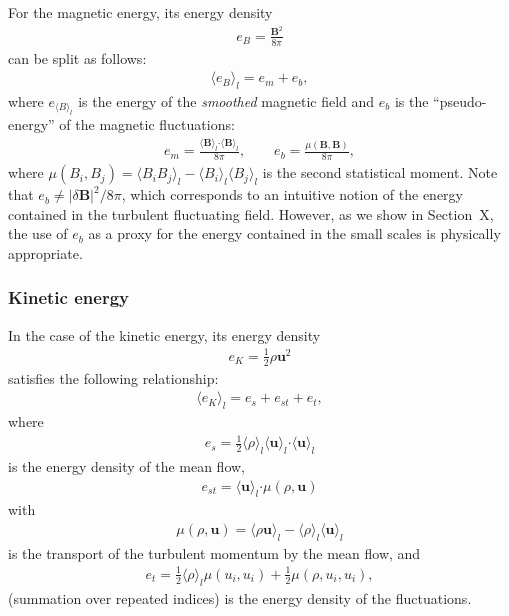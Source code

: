 \documentclass[]{article}
\newcommand{\bcdot}{\bm{\cdot}}
\begin{document}
For the magnetic energy, its energy density 
%
\begin{align}
	e_B = \frac{\bm B^2}{8\pi}
\end{align}
%
can be split as follows:
%
\begin{align}
	\langle e_B \rangle_l = e_{m} + e_b,
\end{align}
%
where $e_{\langle B \rangle_l}$ is the energy of the \textit{smoothed} magnetic field and $e_b$ is the ``pseudo-energy'' of the magnetic fluctuations:
%
\begin{align}
	e_{m} = \frac{\langle \bm B \rangle_l \bcdot \langle \bm B \rangle_l}{8\pi}, \hspace{2em} e_b = \frac{\mu(\bm B, \bm B)}{8\pi},
\end{align}
%
where $\mu(B_i, B_j) = \langle B_i B_j \rangle_l - \langle B_i \rangle_l \langle B_j \rangle_l$ is the second statistical moment. Note that $e_b \neq |\delta \bm B|^2 / 8\pi$, which corresponds to an intuitive notion of the energy contained in the turbulent fluctuating field. However, as we show in Section~X, the use of $e_b$ as a proxy for the energy contained in the small scales is physically appropriate. 


\subsubsection{Kinetic energy}

In the case of the kinetic energy, its energy density 
%
\begin{align}
	e_K = \frac{1}{2} \rho \bm u^2
\end{align}
%
satisfies the following relationship:
%
\begin{align}
	\langle e_K \rangle_l = e_{s} + e_{st} + e_t,
\end{align}
%
where
%
\begin{align}
	e_s = \frac{1}{2} \langle \rho \rangle_l  \langle \bm u \rangle_l \bcdot \langle \bm u \rangle_l
\end{align}
%
is the energy density of the mean flow,
%
\begin{align}
	e_{st} =  \langle \bm u \rangle_l \bcdot \mu (\rho, \bm u)
\end{align}
%
with 
%
\begin{align}
	\mu(\rho, \bm u) = \langle \rho \bm u \rangle_l - \langle \rho \rangle_l  \langle \bm u \rangle_l
\end{align}
%
is the transport of the turbulent momentum by the mean flow, and 
%
\begin{align}
	e_t = \frac{1}{2} \langle \rho \rangle_l \mu(u_i, u_i) + \frac{1}{2} \mu(\rho, u_i, u_i),
\end{align}
%
(summation over repeated indices) is the energy density of the fluctuations.
\end{document}
